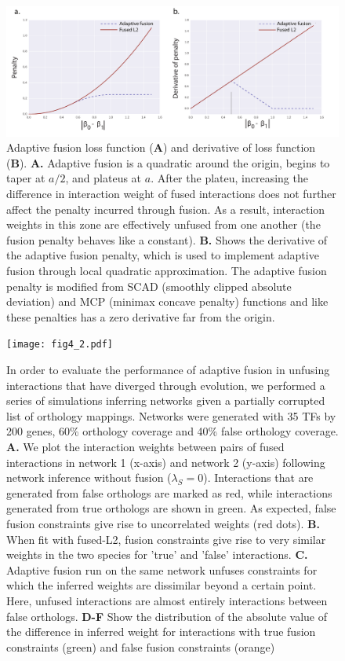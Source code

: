 \documentclass[11pt]{article}
\begin{document}
\begin{figure}
\begin{center}
  \includegraphics[scale=0.45]{fig3.pdf}
  \caption{\label{adapt-schematic} Adaptive fusion loss function (\textbf{A}) and derivative of loss function (\textbf{B}). 
  \textbf{A.} Adaptive fusion is a quadratic around the origin, begins to taper at $a/2$, and plateus at $a$. After the plateu, increasing the difference in interaction weight of fused interactions does not further affect the penalty incurred through fusion. As a result, interaction weights in this zone are effectively unfused from one another (the fusion penalty behaves like a constant). 
  \textbf{B.} Shows the derivative of the adaptive fusion penalty, which is used to implement adaptive fusion through local quadratic approximation. The adaptive fusion penalty is modified from SCAD (smoothly clipped absolute deviation) and MCP (minimax concave penalty) functions and like these penalties has a zero derivative far from the origin. }
\end{center}
\end{figure}

\begin{figure}
\begin{center}
  \texttt{[image: fig4\_2.pdf]}
  \caption{\label{adaptivefusion} In order to evaluate the performance of adaptive fusion in unfusing interactions that have diverged through evolution, we performed a series of simulations inferring networks given a partially corrupted list of orthology mappings. 
  Networks were generated with 35 TFs by 200 genes, 60\% orthology coverage and 40\% false orthology coverage. \textbf{A.} We plot the interaction weights between pairs of fused interactions in network 1 (x-axis) and network 2 (y-axis) following network inference without fusion ($\lambda_S=0$). 
  Interactions that are generated from false orthologs are marked as red, while interactions generated from true orthologs are shown in green. 
  As expected, false fusion constraints give rise to uncorrelated weights (red dots). \textbf{B.} 
  When fit with fused-L2, fusion constraints give rise to very similar weights in the two species for 'true' and 'false' interactions. 
  \textbf{C.} Adaptive fusion run on the same network unfuses constraints for which the inferred weights are dissimilar beyond a certain point. 
  Here, unfused interactions are almost entirely interactions between false orthologs. \textbf{D-F} Show the distribution of the absolute value of the difference in inferred weight for interactions with true fusion constraints (green) and false fusion constraints (orange)}
\end{center}
\end{figure}
\end{document}
